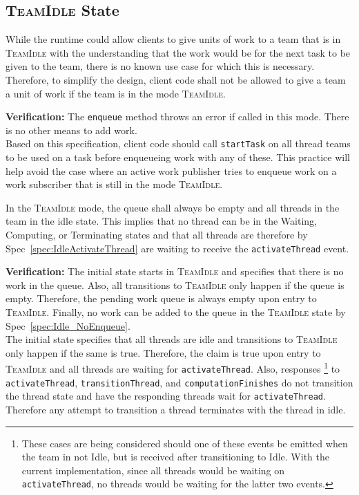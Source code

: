 \documentclass{article}
\newcommand{\TeamIdle}          {\textsc{TeamIdle}}
\begin{document}
\subsection{{\TeamIdle} State}
\begin{spec}
\label{spec:Idle_NoEnqueue}
While the runtime could allow clients to give units of work to a team that is in
{\TeamIdle} with the understanding that the work would be for the next task to
be given to the team, there is no known use case for which this is necessary.
Therefore, to simplify the design, client code shall not be allowed to give a
team a unit of work if the team is in the mode \TeamIdle.  
\end{spec}
\textbf{Verification:}\hspace{0.125in}  The \texttt{enqueue} method throws an
error if called in this mode.  There is no other means to add work.\\

Based on this specification, client code should call \texttt{startTask} on all
thread teams to be used on a task before enqueueing work with any of these.  This
practice will help avoid the case where an active work publisher tries to
enqueue work on a work subscriber that is still in the mode \TeamIdle.

\begin{spec}
In the {\TeamIdle} mode, the queue shall always be empty and all threads in the
team in the idle state.  This implies that no thread can be in the Waiting,
Computing, or Terminating states and that all threads are therefore by
Spec~\ref{spec:IdleActivateThread} are waiting to receive the
\texttt{activateThread} event.
\end{spec}
\textbf{Verification:}\hspace{0.125in}  The initial state starts in {\TeamIdle}
and specifies that there is no work in the queue.  Also, all transitions to
{\TeamIdle} only happen if the queue is empty.  Therefore, the pending work
queue is always empty upon entry to \TeamIdle.  Finally, no work can be added to
the queue in the {\TeamIdle} state by Spec~\ref{spec:Idle_NoEnqueue}.\\

The initial state specifies that all threads are idle and transitions to
{\TeamIdle} only happen if the same is true.  Therefore, the claim is true upon
entry to {\TeamIdle} and all threads are waiting for \texttt{activateThread}.
Also, responses
\footnote{These cases are being considered should one of these
events be emitted when the team in not Idle, but is received after transitioning
to Idle.  With the current implementation, since all threads would be waiting on
\texttt{activateThread}, no threads would be waiting for the latter two events.}
to \texttt{activateThread}, \texttt{transitionThread}, and
\texttt{computationFinishes} do not transition the thread state and have the
responding threads wait for \texttt{activateThread}.  Therefore any attempt to
transition a thread terminates with the thread in idle.
\end{document}
